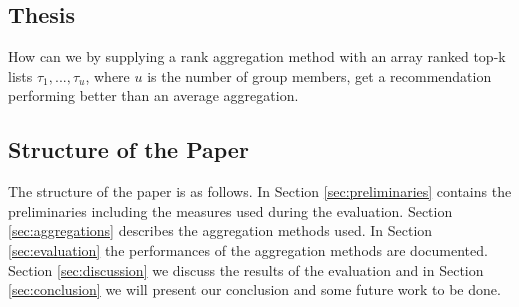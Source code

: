 \subsection{Thesis}
How can we by supplying a rank aggregation method with an array ranked top-k lists $\tau_1, ... , \tau_u$, where $u$ is the number of group members, get a recommendation performing better than an average aggregation. 

\subsection{Structure of the Paper}
The structure of the paper is as follows. In Section \ref{sec:preliminaries} contains the preliminaries including the measures used during the evaluation. Section \ref{sec:aggregations} describes the aggregation methods used. In Section \ref{sec:evaluation} the performances of the aggregation methods are documented. Section \ref{sec:discussion} we discuss the results of the evaluation and in Section \ref{sec:conclusion} we will present our conclusion and some future work to be done.